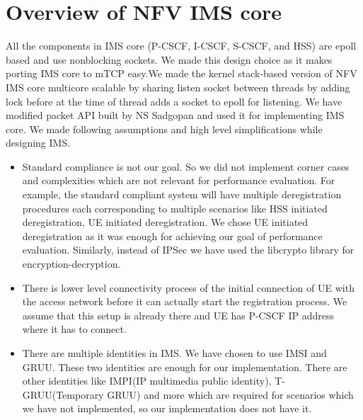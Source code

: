\documentclass[hidelinks]{report}
\begin{document}
\section*{Overview of NFV IMS core}
All the components in IMS core (P-CSCF, I-CSCF, S-CSCF, and HSS) are epoll based and use nonblocking sockets. We made this design choice as it makes porting IMS core to mTCP easy.We made the kernel stack-based version of NFV IMS core multicore scalable by sharing listen socket between threads by adding lock before at the time of thread adds a socket to epoll for listening. We have modified packet API built by NS Sadgopan  and used it for implementing IMS core. We made following assumptions and high level  simplifications while designing IMS.
\begin{itemize}
\item Standard compliance is not our goal. So we did not implement corner cases and complexities which are not relevant for performance evaluation. For example, the standard compliant system will have multiple deregistration procedures each corresponding to multiple scenarios like HSS initiated deregistration, UE initiated deregistration. We chose UE initiated deregistration as it was enough for achieving our goal of performance evaluation. Similarly, instead of IPSec we have used the libcrypto library for encryption-decryption.
\item There is lower level connectivity process of the initial connection of UE with the access network before it can actually start the registration process. We assume that this setup is already there and UE has P-CSCF IP address where it has to connect. 
\item There are multiple identities in IMS. We have chosen to use IMSI and GRUU. These two identities are enough for our implementation. There are other identities like IMPI(IP multimedia public identity), T-GRUU(Temporary GRUU) and more which are required for scenarios which we have not implemented, so our implementation does not have it.

\end{itemize}
\end{document}

